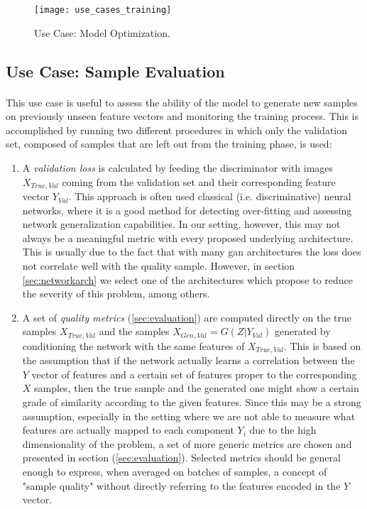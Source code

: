 \begin{figure}[h!]
	\begin{center}
		\texttt{[image: use\_cases\_training]}
	\end{center}
	
	\captionsetup{width=\linewidth}
	\caption[Use Case: Model Optimization]{Use Case: Model Optimization.}
	\label{fig:usecase_train}
\end{figure}



\subsection{Use Case: Sample Evaluation}
\label{sec:usecase_valid}
\paragraph{} This use case is useful to assess the ability of the model to generate new samples on previously unseen feature vectors and monitoring the training process. This is accomplished by running two different procedures in which only the validation set, composed of samples that are left out from the training phase, is used:
\begin{enumerate}
	\item A \textit{validation loss} is calculated by feeding the discriminator with images $X_{True, Val}$ coming from the validation set and their corresponding feature vector $Y_{Val}$. This approach is often used classical (i.e. discriminative) neural networks, where it is a good method for detecting over-fitting and assessing network generalization capabilities. In our setting, however, this may not always be a meaningful metric with every proposed underlying architecture. This is usually due to the fact that with many \gls{gan} architectures the loss does not correlate well with the quality sample. However, in section \ref{sec:networkarch} we select one of the architectures which propose to reduce the severity of this problem, among others. 
	\item  A set of \textit{quality metrics} (\ref{sec:evaluation}) are computed directly on the true samples $X_{True, Val}$ and the samples $X_{Gen, Val} = G(Z | Y_{Val}) $ generated by conditioning the network with the same features of $X_{True, Val}$. This is based on the assumption that if the network actually learns a correlation between the $Y$ vector of features and a certain set of features proper to the corresponding $X$ samples, then the true sample and the generated one might show a certain grade of similarity according to the given features. Since this may be a strong assumption, especially in the setting where we are not able to measure what features are actually mapped to each component %
	 $Y_i$ due to the high dimensionality of the problem, a set of more generic metrics are chosen and presented in section (\ref{sec:evaluation}). Selected metrics should be general enough to express, when averaged on batches of samples, a concept of "sample quality" without directly referring to the features encoded in the $Y$ vector.
\end{enumerate}
